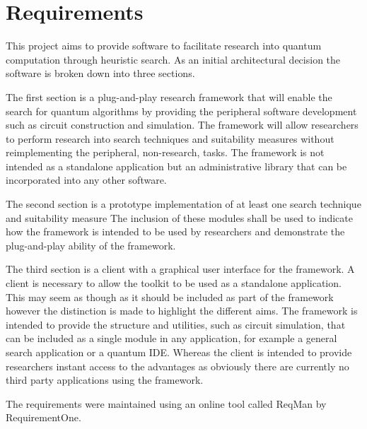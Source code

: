 \chapter{Requirements}

This project aims to provide software to facilitate research into quantum computation through heuristic search.
As an initial architectural decision the software is broken down into three sections.

The first section is a plug-and-play research framework that will enable the search for quantum algorithms by providing the peripheral software development such as circuit construction and simulation.
The framework will allow researchers to perform research into search techniques and suitability measures without reimplementing the peripheral, non-research, tasks.
The framework is not intended as a standalone application but an administrative library that can be incorporated into any other software.

The second section is a prototype implementation of at least one search technique and suitability measure
The inclusion of these modules shall be used to indicate how the framework is intended to be used by researchers and demonstrate the plug-and-play ability of the framework.

The third section is a client with a graphical user interface for the framework.
A client is necessary to allow the toolkit to be used as a standalone application.
This may seem as though as it should be included as part of the framework however the distinction is made to highlight the different aims.
The framework is intended to provide the structure and utilities, such as circuit simulation, that can be included as a single module in any application, for example a general search application or a quantum IDE.
Whereas the client is intended to provide researchers instant access to the advantages as obviously there are currently no third party applications using the framework.

The requirements were maintained using an online tool called ReqMan by RequirementOne\cite{reqman}.

